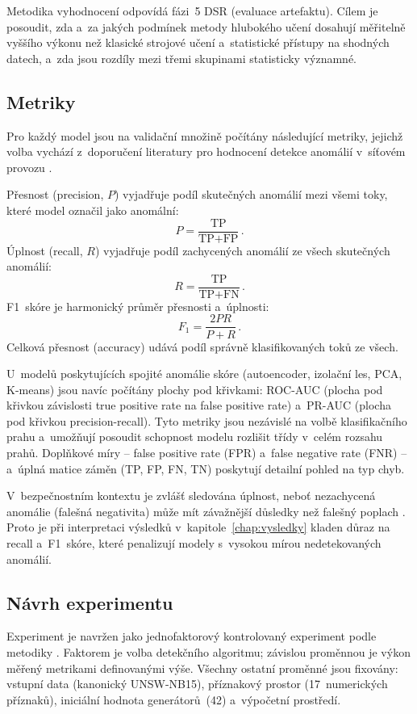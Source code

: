 Metodika vyhodnocení odpovídá fázi~5 DSR (evaluace artefaktu). Cílem je posoudit, zda a~za jakých podmínek metody hlubokého učení dosahují měřitelně vyššího výkonu než klasické strojové učení a~statistické přístupy na shodných datech, a~zda jsou rozdíly mezi třemi skupinami statisticky významné.

\subsection{Metriky}
\label{sec:metriky}

Pro každý model jsou na validační množině počítány následující metriky, jejichž volba vychází z~doporučení literatury pro hodnocení detekce anomálií v~síťovém provozu \parencite{Ji2024, Bakhshi2021}.

Přesnost (precision, $P$) vyjadřuje podíl skutečných anomálií mezi všemi toky, které model označil jako anomální:
\[
P = \frac{\text{TP}}{\text{TP} + \text{FP}}\,.
\]
Úplnost (recall, $R$) vyjadřuje podíl zachycených anomálií ze všech skutečných anomálií:
\[
R = \frac{\text{TP}}{\text{TP} + \text{FN}}\,.
\]
F1~skóre je harmonický průměr přesnosti a~úplnosti:
\[
F_1 = \frac{2PR}{P + R}\,.
\]
Celková přesnost (accuracy) udává podíl správně klasifikovaných toků ze všech.

U~modelů poskytujících spojité anomálie skóre (autoencoder, izolační les, PCA, K-means) jsou navíc počítány plochy pod křivkami: ROC-AUC (plocha pod křivkou závislosti true positive rate na false positive rate) a~PR-AUC (plocha pod křivkou precision-recall). Tyto metriky jsou nezávislé na volbě klasifikačního prahu a~umožňují posoudit schopnost modelu rozlišit třídy v~celém rozsahu prahů. Doplňkové míry -- false positive rate (FPR) a~false negative rate (FNR) -- a~úplná matice záměn (TP, FP, FN, TN) poskytují detailní pohled na typ chyb.

V~bezpečnostním kontextu je zvlášť sledována úplnost, neboť nezachycená anomálie (falešná negativita) může mít závažnější důsledky než falešný poplach \parencite{OzkanOkay2021}. Proto je při interpretaci výsledků v~kapitole~\ref{chap:vysledky} kladen důraz na recall a~F1~skóre, které penalizují modely s~vysokou mírou nedetekovaných anomálií.

\subsection{Návrh experimentu}
\label{sec:design-experimentu}

Experiment je navržen jako jednofaktorový kontrolovaný experiment podle metodiky \textcite{Wohlin2012}. Faktorem je volba detekčního algoritmu; závislou proměnnou je výkon měřený metrikami definovanými výše. Všechny ostatní proměnné jsou fixovány: vstupní data (kanonický UNSW-NB15), příznakový prostor (17~numerických příznaků),  iniciální hodnota generátorů~(42) a~výpočetní prostředí.

